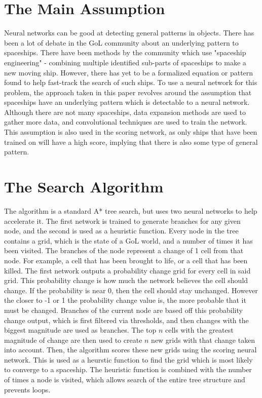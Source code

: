 \documentclass{l4proj}
\begin{document}
\section{The Main Assumption}

Neural networks can be good at detecting general patterns in objects. There has been a lot of debate in the GoL community about an underlying pattern to spaceships. There have been methods by the community which use "spaceship engineering" - combining multiple identified sub-parts of spaceships to make a new moving ship. However, there has yet to be a formalized equation or pattern found to help fast-track the search of such ships. To use a neural network for this problem, the approach taken in this paper revolves around the assumption that spaceships have an underlying pattern which is detectable to a neural network. Although there are not many spaceships, data expansion methods are used to gather more data, and convolutional techniques are used to train the network. This assumption is also used in the scoring network, as only ships that have been trained on will have a high score, implying that there is also some type of general pattern. 


\section{The Search Algorithm}

The algorithm is a standard A* tree search, but uses two neural networks to help accelerate it. The first network is trained to generate branches for any given node, and the second is used as a heuristic function. Every node in the tree contains a grid, which is the state of a GoL world, and a number of times it has been visited. The branches of the node represent a change of 1 cell from that node. For example, a cell that has been brought to life, or a cell that has been killed. The first network outputs a probability change grid for every cell in said grid. This probability change is how much the network believes the cell should change. If the probability is near 0, then the cell should stay unchanged. However the closer to -1 or 1 the probability change value is, the more probable that it must be changed. Branches of the current node are based off this probability change output, which is first filtered via thresholds, and then changes with the biggest magnitude are used as branches. The top $n$ cells with the greatest magnitude of change are then used to create $n$ new grids with that change taken into account. Then, the algorithm scores these new grids using the scoring neural network. This is used as a heurstic function to find the grid which is most likely to converge to a spaceship. The heuristic function is combined with the number of times a node is visited, which allows search of the entire tree structure and prevents loops.  
\end{document}
